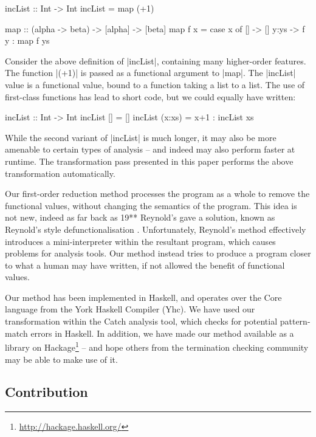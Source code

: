 \documentclass[preprint]{sigplanconf}
\begin{document}
\begin{example}
\label{ex:incList}
\begin{code}
incList :: Int -> Int
incList = map (+1)

map :: (alpha -> beta) -> [alpha] -> [beta]
map f x = case  x of
                []    -> []
                y:ys  -> f y : map f ys
\end{code}

Consider the above definition of |incList|, containing many higher-order features. The function |(+1)| is passed as a functional argument to |map|. The |incList| value is a functional value, bound to a function taking a list to a list. The use of first-class functions has lead to short code, but we could equally have written:

\begin{code}
incList :: Int -> Int
incList []      = []
incList (x:xs)  = x+1 : incList xs
\end{code}

While the second variant of |incList| is much longer, it may also be more amenable to certain types of analysis -- and indeed may also perform faster at runtime. The transformation pass presented in this paper performs the above transformation automatically.
\end{example}

Our first-order reduction method processes the program as a whole to remove the functional values, without changing the semantics of the program. This idea is not new, indeed as far back as 19** Reynold's gave a solution, known as Reynold's style defunctionalisation \cite{reynolds:defunctionalisation}. Unfortunately, Reynold's method effectively introduces a mini-interpreter within the resultant program, which causes problems for analysis tools. Our method instead tries to produce a program closer to what a human may have written, if not allowed the benefit of functional values.

Our method has been implemented in Haskell, and operates over the Core language from the York Haskell Compiler (Yhc). We have used our transformation within the Catch analysis tool, which checks for potential pattern-match errors in Haskell. In addition, we have made our method available as a library on Hackage\footnote{\url{http://hackage.haskell.org/}} -- and hope others from the termination checking community may be able to make use of it.

\subsection{Contribution}
\end{document}
